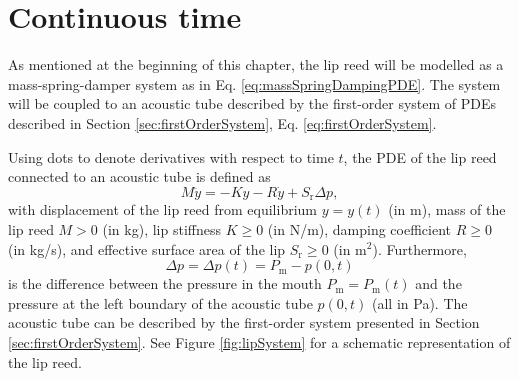 \section{Continuous time}\label{sec:lipreedContinuous}
As mentioned at the beginning of this chapter, the lip reed will be modelled as a mass-spring-damper system as in Eq. \eqref{eq:massSpringDampingPDE}. The system will be coupled to an acoustic tube described by the first-order system of PDEs described in Section \ref{sec:firstOrderSystem}, Eq. \eqref{eq:firstOrderSystem}.

Using dots to denote derivatives with respect to time $t$, the PDE of the lip reed connected to an acoustic tube is defined as
\begin{equation}\label{eq:lipReedDimensional}
    M\ddot y = -K y - R \dot y + S_\text{r}\Delta p,
\end{equation}
with displacement of the lip reed from equilibrium $y = y(t)$ (in m), mass of the lip reed $M > 0$ (in kg), lip stiffness $K\geq 0$ (in N/m), damping coefficient $R\geq 0$ (in kg/s), and effective surface area of the lip $S_\text{r}\geq 0$ (in m$^2$). Furthermore,  
\begin{equation}\label{eq:deltaP}
    \Delta p = \Delta p(t) = P_\text{m} - p(0,t)
\end{equation}
is the difference between the pressure in the mouth $P_\text{m} = P_\text{m}(t)$ and the pressure at the left boundary of the acoustic tube $p(0,t)$ (all in Pa). The acoustic tube can be described by the first-order system presented in Section \ref{sec:firstOrderSystem}. See Figure \ref{fig:lipSystem} for a schematic representation of the lip reed.


